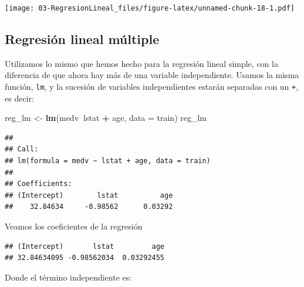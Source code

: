 \documentclass[]{book}
\newenvironment{Shaded}{\begin{snugshade}}{\end{snugshade}}
\newcommand{\DataTypeTok}[1]{\textcolor[rgb]{0.13,0.29,0.53}{#1}}
\newcommand{\DecValTok}[1]{\textcolor[rgb]{0.00,0.00,0.81}{#1}}
\newcommand{\KeywordTok}[1]{\textcolor[rgb]{0.13,0.29,0.53}{\textbf{#1}}}
\newcommand{\NormalTok}[1]{#1}
\newcommand{\OperatorTok}[1]{\textcolor[rgb]{0.81,0.36,0.00}{\textbf{#1}}}
\newcommand{\StringTok}[1]{\textcolor[rgb]{0.31,0.60,0.02}{#1}}
\begin{document}
\texttt{[image: 03-RegresionLineal\_files/figure-latex/unnamed-chunk-18-1.pdf]}

\hypertarget{regresion-lineal-multiple}{%
\subsection{Regresión lineal múltiple}\label{regresion-lineal-multiple}}

Utilizamos lo mismo que hemos hecho para la regresión lineal simple, con la diferencia de que ahora hay más de una variable independiente.
Usamos la misma función, \texttt{lm}, y la sucesión de variables independientes estarán separadas con un \texttt{+}, es decir:

\begin{Shaded}
\begin{Highlighting}[]
\NormalTok{reg_lm <-}\StringTok{ }\KeywordTok{lm}\NormalTok{(medv}\OperatorTok{~}\NormalTok{lstat }\OperatorTok{+}\StringTok{ }\NormalTok{age, }\DataTypeTok{data =}\NormalTok{ train)}
\NormalTok{reg_lm}
\end{Highlighting}
\end{Shaded}

\begin{verbatim}
## 
## Call:
## lm(formula = medv ~ lstat + age, data = train)
## 
## Coefficients:
## (Intercept)        lstat          age  
##    32.84634     -0.98562      0.03292
\end{verbatim}

Veamos los coeficientes de la regresión

\begin{Shaded}
\end{Shaded}

\begin{verbatim}
## (Intercept)       lstat         age 
## 32.84634095 -0.98562034  0.03292455
\end{verbatim}

Donde el término independiente es:

\begin{Shaded}
\end{Shaded}
\end{document}
